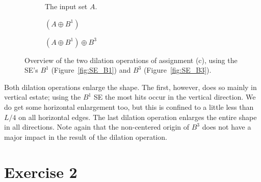\documentclass{article}
\begin{document}
\begin{figure}[H]
     \centering
     \begin{subfigure}[b]{0.27\textwidth}
         \centering
         
         \caption{The input set $A$.}
         \label{fig:ex1_c-inputset}
     \end{subfigure}
     \hfill
     \begin{subfigure}[b]{0.29\textwidth}
         \centering
         
         \caption{$(A \oplus B^1)$}
         \label{fig:ex1_c-step1}
     \end{subfigure}
     \hfill
     \begin{subfigure}[b]{0.37\textwidth}
         \centering
         
         \caption{$(A \oplus B^1) \oplus B^3$}
         \label{fig:ex1_c-step2}
     \end{subfigure}
     
    \caption{Overview of the two dilation operations of assignment (c), using the SE's $B^1$ (Figure~\ref{fig:SE_B1}) and $B^3$ (Figure~\ref{fig:SE_B3}).}
    \label{fig:ex1_c}
\end{figure}

Both dilation operations enlarge the shape. The first, however, does so mainly in vertical estate; using the $B^1$ SE the most hits occur in the vertical direction. We do get some horizontal enlargement too, but this is confined to a little less than $L/4$ on all horizontal edges. The last dilation operation enlarges the entire shape in all directions. Note again that the non-centered origin of $B^3$ does not have a major impact in the result of the dilation operation.

\section*{Exercise 2}
\end{document}
